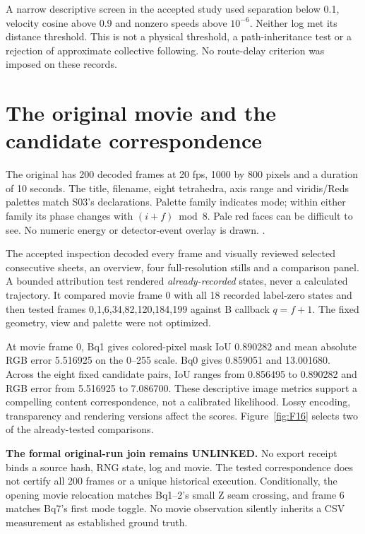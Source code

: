 A narrow descriptive screen in the accepted study used separation
below 0.1, velocity cosine above 0.9 and nonzero speeds above
$10^{-6}$. Neither log met its distance threshold. This is not
a physical threshold, a path-inheritance test or a rejection of
approximate collective following. No route-delay criterion was
imposed on these records. 

\section{The original movie and the candidate correspondence}
The original  has
200 decoded frames at 20 fps, 1000 by 800 pixels and a duration of
10 seconds. The title, filename, eight tetrahedra, axis range and
viridis/Reds palettes match S03's declarations. Palette family
indicates mode; within either family its phase changes with
$(i+f)\bmod8$. Pale red faces can be difficult to see.
No numeric energy or detector-event overlay is drawn.
. 

The accepted inspection decoded every frame and visually reviewed
selected consecutive sheets, an overview, four full-resolution
stills and a comparison panel. A bounded attribution test rendered
\emph{already-recorded} states, never a calculated trajectory.
It compared movie frame 0 with all 18 recorded label-zero states and then
tested frames 0,1,6,34,82,120,184,199 against B callback $q=f+1$.
The fixed geometry, view and palette were not optimized.

At movie frame 0, Bq1 gives colored-pixel mask IoU 0.890282 and mean
absolute RGB error 5.516925 on the 0--255 scale. Bq0 gives
0.859051 and 13.001680. Across the eight fixed candidate pairs,
IoU ranges from 0.856495 to 0.890282 and RGB error from
5.516925 to 7.086700. These descriptive image metrics support
a compelling content correspondence, not a calibrated likelihood.
Lossy encoding, transparency and rendering versions affect the
scores. Figure~\ref{fig:F16} selects two of the already-tested
comparisons. 

\textbf{The formal original-run join remains UNLINKED.}
No export receipt binds a source hash, RNG state, log and movie.
The tested correspondence does not certify all 200 frames or a
unique historical execution. Conditionally, the opening movie
relocation matches Bq1--2's small Z seam crossing, and frame 6
matches Bq7's first mode toggle. No movie observation silently
inherits a CSV measurement as established ground truth.

